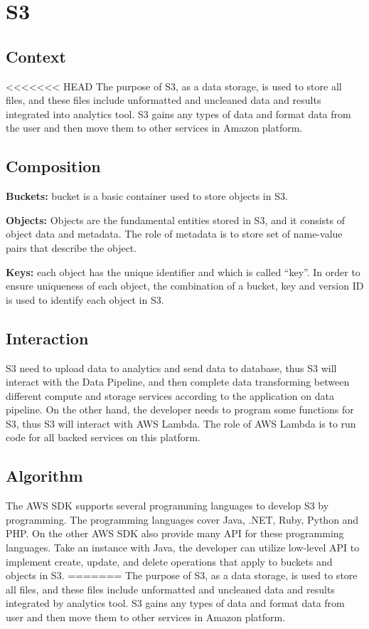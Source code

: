 \section{S3}
	\subsection{Context}
<<<<<<< HEAD
	The purpose of S3, as a data storage, is used to store all files, and these files include unformatted and uncleaned data and results integrated into analytics tool. S3 gains any types of data and format data from the user and then move them to other services in Amazon platform.
        
	\subsection{Composition}
	\textbf{Buckets:} bucket is a basic container used to store objects in S3.\cite{z1}
     
    \noindent \textbf{Objects:} Objects are the fundamental entities stored in S3, and it consists of object data and metadata. The role of metadata is to store set of name-value pairs that describe the object.\cite{z1}
        
	\noindent \textbf{Keys:} each object has the unique identifier and which is called “key”. In order to ensure uniqueness of each object, the combination of a bucket, key and version ID is used to identify each object in S3.\cite{z1}
    
	\subsection{Interaction}
    S3 need to upload data to analytics and send data to database, thus S3 will interact with the Data Pipeline, and then complete data transforming between different compute and storage services according to the application on data pipeline. On the other hand, the developer needs to program some functions for S3, thus S3 will interact with AWS Lambda. The role of AWS Lambda is to run code for all backed services on this platform.
    
	\subsection{Algorithm}
    The AWS SDK supports several programming languages to develop S3 by programming. The programming languages cover Java, .NET, Ruby, Python and PHP. On the other AWS SDK also provide many API for these programming languages. Take an instance with Java, the developer can utilize low-level API to implement create, update, and delete operations that apply to buckets and objects in S3.\cite{z2} 
=======
	The purpose of S3, as a data storage, is used to store all files, and these files include unformatted and uncleaned data and results integrated by analytics tool. S3 gains any types of data and format data from user and then move them to other services in Amazon platform.
        
